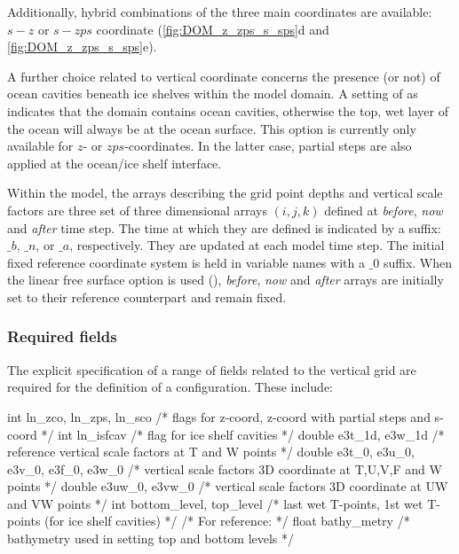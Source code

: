 \documentclass[../main/NEMO_manual]{subfiles}
\begin{document}
Additionally, hybrid combinations of the three main coordinates are available:
$s-z$ or $s-zps$ coordinate (\autoref{fig:DOM_z_zps_s_sps}d and \autoref{fig:DOM_z_zps_s_sps}e).

A further choice related to vertical coordinate concerns
the presence (or not) of ocean cavities beneath ice shelves within the model domain.
A setting of  as  indicates that
the domain contains ocean cavities,
otherwise the top, wet layer of the ocean will always be at the ocean surface.
This option is currently only available for $z$- or $zps$-coordinates.
In the latter case, partial steps are also applied at the ocean/ice shelf interface.

Within the model,
the arrays describing the grid point depths and vertical scale factors are
three set of three dimensional arrays $(i,j,k)$ defined at
\textit{before}, \textit{now} and \textit{after} time step.
The time at which they are defined is indicated by a suffix: $\_b$, $\_n$, or $\_a$, respectively.
They are updated at each model time step.
The initial fixed reference coordinate system is held in variable names with a $\_0$ suffix.
When the linear free surface option is used (),
\textit{before}, \textit{now} and \textit{after} arrays are initially set to
their reference counterpart and remain fixed.

\subsubsection{Required fields}
\label{sec:DOM_zgr_fields}

The explicit specification of a range of fields related to the vertical grid are required for
the definition of a configuration.
These include:

\begin{forlines}
int    ln_zco, ln_zps, ln_sco            /* flags for z-coord, z-coord with partial steps and s-coord    */
int    ln_isfcav                         /* flag  for ice shelf cavities                                 */
double e3t_1d, e3w_1d                    /* reference vertical scale factors at T and W points           */
double e3t_0, e3u_0, e3v_0, e3f_0, e3w_0 /* vertical scale factors 3D coordinate at T,U,V,F and W points */
double e3uw_0, e3vw_0                    /* vertical scale factors 3D coordinate at UW and VW points     */
int    bottom_level, top_level           /* last wet T-points, 1st wet T-points (for ice shelf cavities) */
                                         /* For reference:                                               */
float  bathy_metry                       /* bathymetry used in setting top and bottom levels             */
\end{forlines}
\end{document}
